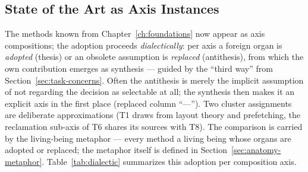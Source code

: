 \begin{nurkurz}
\section{State of the Art as Axis Instances}\label{sec:sota-instances}
The methods known from Chapter~\ref{ch:foundations} now appear as axis compositions; the adoption proceeds
\emph{dialectically}: per axis a foreign organ is \emph{adopted} (thesis) or an obsolete assumption is
\emph{replaced} (antithesis), from which the own contribution emerges as synthesis --- guided by the
\enquote{third way} from Section~\ref{sec:task-concerns}. Often the antithesis is merely the implicit
assumption of not regarding the decision as selectable at all; the synthesis then makes it an explicit axis
in the first place (replaced column \enquote{---}). Two cluster assignments are deliberate approximations
(T1 draws from layout theory and prefetching, the reclamation sub-axis of T6 shares its sources with T8).
The comparison is carried by the living-being metaphor --- every method a living being whose organs are
adopted or replaced; the metaphor itself is defined in Section~\ref{sec:anatomy-metaphor}.
Table~\ref{tab:dialectic} summarizes this adoption per composition axis.
\end{nurkurz}

